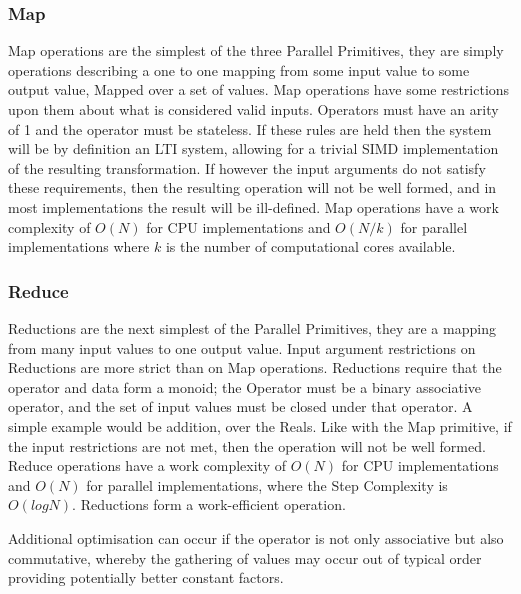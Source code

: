 \subsubsection{Map}

Map operations are the simplest of the three Parallel Primitives, they are simply operations
describing a one to one mapping from some input value to some output value, Mapped over a set of
values. Map operations have some restrictions upon them about what is considered valid inputs.
Operators must have an arity of 1 and the operator must be stateless. If these rules are held then
the system will be by definition an LTI system, allowing for a trivial SIMD implementation of the
resulting transformation. If however the input arguments do not satisfy these requirements, then the
resulting operation will not be well formed, and in most implementations the result will be
ill-defined. Map operations have a work complexity of $ O(N) $ for CPU implementations and $ O(N/k)
$ for parallel implementations where $ k $ is the number of computational cores available.

\FloatBarrier
\subsubsection{Reduce}

Reductions are the next simplest of the Parallel Primitives, they are a mapping from many input
values to one output value. Input argument restrictions on Reductions are more strict than on Map
operations. Reductions require that the operator and data form a monoid; the Operator must be a
binary associative operator, and the set of input values must be closed under that operator. A
simple example would be addition, over the Reals. Like with the Map primitive, if the input
restrictions are not met, then the operation will not be well formed. Reduce operations have a work
complexity of $ O(N) $ for CPU implementations and $ O(N) $ for parallel implementations, where the
Step Complexity is $ O(log N) $. Reductions form a work-efficient operation.

Additional optimisation can occur if the operator is not only associative but also commutative,
whereby the gathering of values may occur out of typical order providing potentially better constant
factors.

